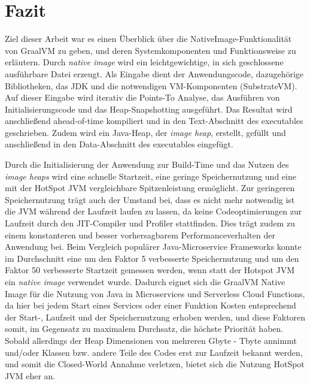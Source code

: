 \newpage
\section{Fazit}
\label{sec:fazit}

Ziel dieser Arbeit war es einen Überblick über die NativeImage-Funktionalität von GraalVM zu geben, und deren Systemkomponenten und Funktionsweise zu erläutern. 
Durch \textit{native image} wird ein leichtgewichtige, in sich geschlossene ausführbare Datei erzeugt. Als Eingabe dient der Anwendungscode, dazugehörige Bibliotheken, das JDK und 
die notwendigen VM-Komponenten (SubstrateVM). Auf dieser Eingabe wird iterativ die Points-To Analyse, das Ausführen
von Initialisierungscode und das Heap-Snapshotting ausgeführt. Das Resultat wird anschließend ahead-of-time kompiliert und in den Text-Abschnitt des executables geschrieben. Zudem wird ein Java-Heap, der \textit{image heap}, erstellt, gefüllt und anschließend in den Data-Abschnitt des executables eingefügt. 

Durch die Initialisierung der Anwendung zur Build-Time und das Nutzen des \textit{image heaps} wird eine schnelle Startzeit, eine geringe Speichernutzung und eine mit der HotSpot JVM vergleichbare Spitzenleistung
ermöglicht.  Zur geringeren Speichernutzung trägt auch der Umstand bei, dass es nicht mehr notwendig ist die JVM während der Laufzeit laufen zu lassen,
 da keine Codeoptimierungen zur Laufzeit durch den JIT-Compiler und Profiler stattfinden. Dies trägt zudem zu einem konstanteren und besser vorhersagbarem Performanceverhalten der Anwendung bei.
 Beim Vergleich populärer Java-Microservice Frameworks konnte im Durchschnitt eine um den Faktor 5 verbesserte Speichernutzung
und um den Faktor 50 verbesserte Startzeit gemessen werden, wenn statt der Hotspot JVM ein \textit{native image} verwendet wurde.
\newline
Dadurch eignet sich die GraalVM Native Image für die Nutzung von Java in Microservices und Serverless Cloud Functions, da hier bei jedem Start eines Services oder einer Funktion 
Kosten entsprechend der Start-, Laufzeit und der Speichernutzung erhoben werden, und diese Faktoren somit, im Gegensatz zu maximalem Durchsatz, die höchste Priorität haben. 
Sobald allerdings der Heap Dimensionen von mehreren Gbyte - Tbyte annimmt und/oder Klassen bzw. andere Teile des Codes erst zur Laufzeit bekannt werden, und somit die Closed-World Annahme verletzen, bietet sich die Nutzung HotSpot JVM eher an. 

